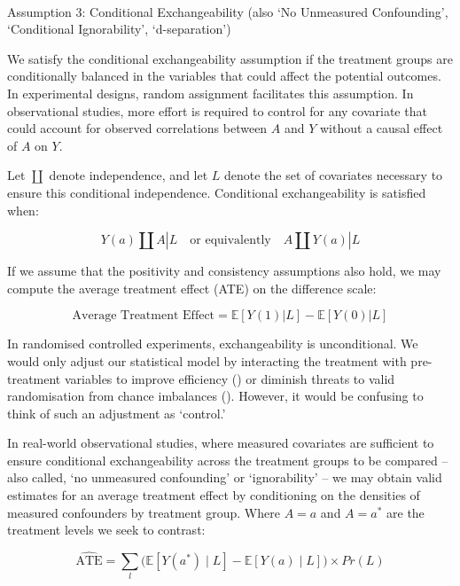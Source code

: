 \documentclass[
  single column]{article}
\makeatletter
\let\oldparagraph\paragraph
\renewcommand{\paragraph}{
    \@ifstar
      \xxxParagraphStar
      \xxxParagraphNoStar
  }
\newcommand{\xxxParagraphStar}[1]{\oldparagraph*{#1}\mbox{}}
\newcommand{\xxxParagraphNoStar}[1]{\oldparagraph{#1}\mbox{}}
\makeatother
\begin{document}
\paragraph{Assumption 3: Conditional Exchangeability (also `No
Unmeasured Confounding', `Conditional Ignorability',
`d-separation')}\label{assumption-3-conditional-exchangeability-also-no-unmeasured-confounding-conditional-ignorability-d-separation}

We satisfy the conditional exchangeability assumption if the treatment
groups are conditionally balanced in the variables that could affect the
potential outcomes. In experimental designs, random assignment
facilitates this assumption. In observational studies, more effort is
required to control for any covariate that could account for observed
correlations between \(A\) and \(Y\) without a causal effect of \(A\) on
\(Y\).

Let \(\coprod\) denote independence, and let \(L\) denote the set of
covariates necessary to ensure this conditional independence.
Conditional exchangeability is satisfied when:

\[
Y(a) \coprod A | L \quad \text{or equivalently} \quad A \coprod Y(a) | L
\]

If we assume that the positivity and consistency assumptions also hold,
we may compute the average treatment effect (ATE) on the difference
scale:

\[
\text{Average Treatment Effect} = \mathbb{E}[Y(1) | L] - \mathbb{E}[Y(0) | L]
\]

In randomised controlled experiments, exchangeability is unconditional.
We would only adjust our statistical model by interacting the treatment
with pre-treatment variables to improve efficiency
() or diminish
threats to valid randomisation from chance imbalances
(). However, it
would be confusing to think of such an adjustment as `control.'

In real-world observational studies, where measured covariates are
sufficient to ensure conditional exchangeability across the treatment
groups to be compared -- also called, `no unmeasured confounding' or
`ignorability' -- we may obtain valid estimates for an average treatment
effect by conditioning on the densities of measured confounders by
treatment group. Where \(A = a\) and \(A = a^*\) are the treatment
levels we seek to contrast:

\[
\widehat{\text{ATE}} =  \sum_l \big( \mathbb{E}[Y(a^*) \mid L] - \mathbb{E}[Y(a) \mid L] \big) \times Pr(L)
\]
\end{document}
